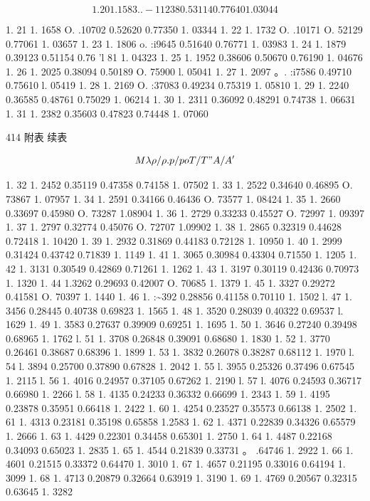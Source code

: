 \[1. 20 1. 1583 . . -11 238 0.53114 0.77640 1.03044\]

1. 21 1. 1658 O. .10702 0.52620 0.77350 1. 03344 1. 22 1. 1732 O. .10171 O. 52129 0.77061 1. 03657 1. 23 1. 1806 o. :i9645 0.51640 0.76771 1. 03983 1. 24 1. 1879 0.39123 0.51154 0.76 'l 81 1. 04323 1. 25 1. 1952 0.38606 0.50670 0.76190 1. 04676 1. 26 1. 2025 0.38094 0.50189 O. 75900 l. 05041 1. 27 1. 2097 。. :i7586 0.49710 0.75610 l. 05419 1. 28 1. 2169 O. :37083 0.49234 0.75319 1. 05810 1. 29 1. 2240 0.36585 0.48761 0.75029 1. 06214 1. 30 1. 2311 0.36092 0.48291 0.74738 1. 06631 1. 31 1. 2382 0.35603 0.47823 0.74448 1. 07060

414 附表 续表

\[M \lambda  \rho /\rho .  p/po T/T" A/A'\]

1. 32 1. 2452 0.35119 0.47358 0.74158 1. 07502 1. 33 1. 2522 0.34640 0.46895 O. 73867 1. 07957 1. 34 1. 2591 0.34166 0.46436 O. 73577 1. 08424 1. 35 1. 2660 0.33697 0.45980 O. 73287 1.08904 1. 36 1. 2729 0.33233 0.45527 O. 72997 1. 09397 1. 37 1. 2797 0.32774 0.45076 O. 72707 1.09902 1. 38 1. 2865 0.32319 0.44628 0.72418 1. 10420 1. 39 1. 2932 0.31869 0.44183 0.72128 1. 10950 1. 40 1. 2999 0.31424 0.43742 0.71839 1. 1149 1. 41 1. 3065 0.30984 0.43304 0.71550 1. 1205 1. 42 1. 3131 0.30549 0.42869 0.71261 1. 1262 1. 43 1. 3197 0.30119 0.42436 0.70973 1. 1320 1. 44 1.3262 0.29693 0.42007 O. 70685 1. 1379 1. 45 1. 3327 0.29272 0.41581 O. 70397 1. 1440 1. 46 1. :\textasciitilde{}392 0.28856 0.41158 0.70110 1. 1502 l. 47 1. 3456 0.28445 0.40738 0.69823 1. 1565 1. 48 1. 3520 0.28039 0.40322 0.69537 l. 1629 1. 49 1. 3583 0.27637 0.39909 0.69251 1. 1695 1. 50 1. 3646 0.27240 0.39498 0.68965 1. 1762 l. 51 1. 3708 0.26848 0.39091 0.68680 1. 1830 1. 52 1. 3770 0.26461 0.38687 0.68396 1. 1899 1. 53 1. 3832 0.26078 0.38287 0.68112 1. 1970 l. 54 l. 3894 0.25700 0.37890 0.67828 1. 2042 1. 55 l. 3955 0.25326 0.37496 0.67545 1. 2115 l. 56 1. 4016 0.24957 0.37105 0.67262 1. 2190 l. 57 l. 4076 0.24593 0.36717 0.66980 1. 2266 l. 58 1. 4135 0.24233 0.36332 0.66699 1. 2343 1. 59 1. 4195 0.23878 0.35951 0.66418 1. 2422 1. 60 1. 4254 0.23527 0.35573 0.66138 1. 2502 1. 61 1. 4313 0.23181 0.35198 0.65858 1.2583 1. 62 1. 4371 0.22839 0.34326 0.65579 1. 2666 1. 63 1. 4429 0.22301 0.34458 0.65301 1. 2750 1. 64 1. 4487 0.22168 0.34093 0.65023 1. 2835 1. 65 1. 4544 0.21839 0.33731 。 .64746 1. 2922 1. 66 1. 4601 0.21515 0.33372 0.64470 1. 3010 1. 67 1. 4657 0.21195 0.33016 0.64194 1. 3099 1. 68 1. 4713 0.20879 0.32664 0.63919 1. 3190 1. 69 1. 4769 0.20567 0.32315 0.63645 1. 3282

